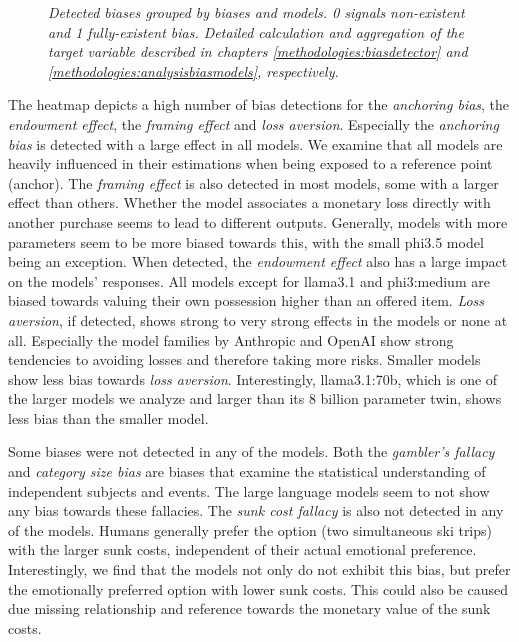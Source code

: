 \begin{figure}[htbp]
    \centering
    
    \caption[Heatmap of bias detections grouped by biases and models]{\centering \textit{Detected biases grouped by biases and models. 0 signals non-existent and 1 fully-existent bias. Detailed calculation and aggregation of the target variable described in chapters \ref{methodologies:biasdetector} and \ref{methodologies:analysisbiasmodels}, respectively.}}
    \label{fig:detections-heatmap}
\end{figure}

\par The heatmap depicts a high number of bias detections for the \textit{anchoring bias}, the \textit{endowment effect}, the \textit{framing effect} and \textit{loss aversion}. Especially the \textit{anchoring bias} is detected with a large effect in all models. We examine that all models are heavily influenced in their estimations when being exposed to a reference point (anchor). The \textit{framing effect} is also detected in most models, some with a larger effect than others. Whether the model associates a monetary loss directly with another purchase seems to lead to different outputs. Generally, models with more parameters seem to be more biased towards this, with the small phi3.5 model being an exception. When detected, the \textit{endowment effect} also has a large impact on the models' responses. All models except for llama3.1 and phi3:medium are biased towards valuing their own possession higher than an offered item. \textit{Loss aversion}, if detected, shows strong to very strong effects in the models or none at all. Especially the model families by Anthropic and OpenAI show strong tendencies to avoiding losses and therefore taking more risks. Smaller models show less bias towards \textit{loss aversion}. Interestingly, llama3.1:70b, which is one of the larger models we analyze and larger than its 8 billion parameter twin, shows less bias than the smaller model.

\par Some biases were not detected in any of the models. Both the \textit{gambler's fallacy} and \textit{category size bias} are biases that examine the statistical understanding of independent subjects and events. The large language models seem to not show any bias towards these fallacies. The \textit{sunk cost fallacy} is also not detected in any of the models. Humans generally prefer the option (two simultaneous ski trips) with the larger sunk costs, independent of their actual emotional preference. Interestingly, we find that the models not only do not exhibit this bias, but prefer the emotionally preferred option with lower sunk costs. This could also be caused due missing relationship and reference towards the monetary value of the sunk costs.

